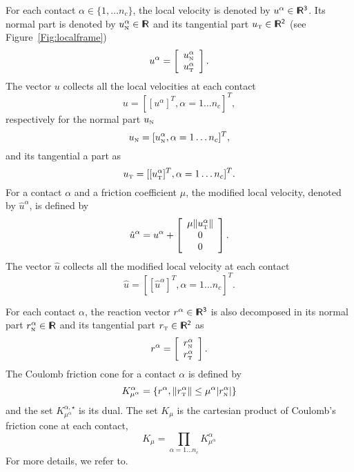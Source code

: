 \documentclass[twoside]{article}
\def\n{{\hbox{\tiny{N}}}}
\def\t{{\hbox{\tiny{T}}}}
\newcommand{\RR}{\ensuremath{\rm\sf I\!R}}
\begin{document}
For each contact $\alpha \in \{1,\ldots n_c\}$, the  local velocity  is denoted by $u^\alpha \in \RR^3$. Its normal part  is denoted by $u_\n^{\alpha}\in \RR$ and its tangential part $u_\t\in\RR^2$ (see Figure~\ref{Fig:localframe})
\begin{equation}
  \label{eq:contactvelocity}
  u^\alpha =\left[
  \begin{array}{c}
    u^\alpha_{\n} \\
    u^\alpha_{\t}   
  \end{array}\right].
\end{equation}
The vector $u$ collects all the local velocities at each contact
\begin{equation}
  \label{eq:normal-collect}
  u = [[u^\alpha]^T, \alpha = 1\ldots n_c]^T,
\end{equation}
respectively for the normal part $u_\n$
\begin{equation}
  \label{eq:normal}
  u_\n = [ u^\alpha_{\n}, \alpha = 1\ldots n_c]^T,
\end{equation}
and its tangential a part as 
\begin{equation}
  \label{eq:tangent}
  u_\t = [ [u^\alpha_{\t}]^T, \alpha = 1\ldots n_c]^T.
\end{equation}
For a contact $\alpha $ and a friction coefficient $\mu$, the modified local velocity, denoted by $\hat u^\alpha $, is defined by
\begin{equation}
  \label{eq:modified}
  \hat u^\alpha = u^\alpha +\left[
  \begin{array}{c}
    \mu \|u^\alpha_\t\| \\
    0 \\
    0
  \end{array}\right].
\end{equation}
The vector $\hat u$ collects all the modified local velocity at each contact
\begin{equation}
  \label{eq:normal-modified}
  \hat u = [[\hat u^\alpha]^T, \alpha = 1\ldots n_c]^T.
\end{equation}

For each contact $\alpha$, the reaction vector $r^\alpha\in \RR^3$ is also decomposed in its normal part $r_\n^{\alpha}\in \RR$ and its tangential part $r_\t\in\RR^2$ as
\begin{equation}
  \label{eq:contactreaction}
  r^\alpha = \left[
  \begin{array}{c}
    r^\alpha_{\n} \\
    r^\alpha_{\t}   
  \end{array}\right].
\end{equation}
The Coulomb friction cone for a  contact $\alpha$ is defined by 
\begin{equation}
  \label{eq:CCC}
  K_{\mu^\alpha}^{\alpha}  = \{r^\alpha, \|r^\alpha_\t \| \leq \mu^\alpha |r^\alpha_\n| \}
\end{equation}
and the set $K^{\alpha,\star}_{\mu^\alpha}$ is its dual. The set $K_{\mu}$ is the cartesian product of Coulomb's friction cone at each contact,
\begin{equation}
  \label{eq:CC}
  K_{\mu} = \prod_{\alpha=1\ldots n_c} K_{\mu^\alpha}^{\alpha} 
\end{equation}
For more details, we refer to\cite{Acary.Brogliato2008}.
\end{document}

